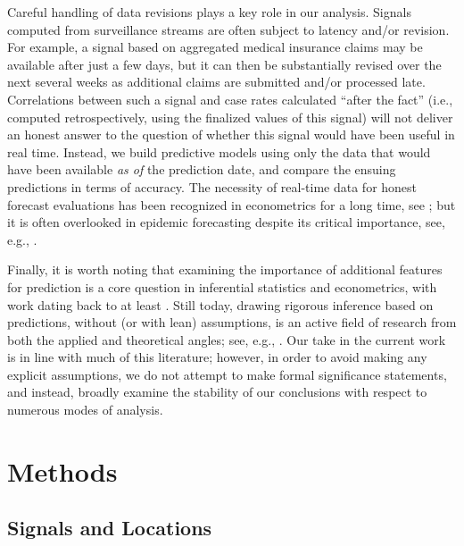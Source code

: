 \documentclass[9pt,twocolumn,twoside,lineno]{pnas-new}
\begin{document}
Careful handling of data revisions plays a key role in our analysis. Signals 
computed from surveillance streams are often subject to latency and/or 
revision. For example, a signal based on aggregated medical insurance claims may
be available after just a few days, but it can then be substantially revised
over the next several weeks as additional claims are submitted and/or processed
late. Correlations between such a signal and case rates calculated ``after the
fact'' (i.e., computed retrospectively, using the finalized values of this
signal) will not deliver an honest answer to the question of whether this signal
would have been useful in real time. Instead, we build predictive models using
only the data that would have been available \textit{as of} the prediction date,
and compare the ensuing predictions in terms of accuracy. The necessity of
real-time data for honest forecast evaluations has been recognized in
econometrics for a long time, see \cite{howrey1978a, harvey1983a, mankiw1986a,
  trivellato1986a, diebold1991a, patterson1995a, koenig2003a, croushore2006a,
  clark2009a, faust2009a, croushore2011a}; but it is often overlooked in
epidemic forecasting despite its critical importance, see, e.g.,
\cite{chakraborty2018know}.  

Finally, it is worth noting that examining the importance of additional features
for prediction is a core question in inferential statistics and econometrics,
with work dating back to at least \cite{Granger:1969}. Still today, drawing
rigorous inference based on predictions, without (or with lean) assumptions, is
an active field of research from both the applied and theoretical angles;
see, e.g., \cite{Diebold:2002, McCraken:2007, Diebold:2015, Stokes:2017,
  Lei:2018, Rinaldo:2019, Williamsom:2020, Zhang:2020, Dai:2021, Fryer:2021}.
Our take in the current work is in line with much of this literature; however,
in order to avoid making any explicit assumptions, we do not attempt to make
formal  significance statements, and instead, broadly examine the stability of
our conclusions with respect to numerous modes of analysis.

\section{Methods}

\subsection{Signals and Locations}
\end{document}
